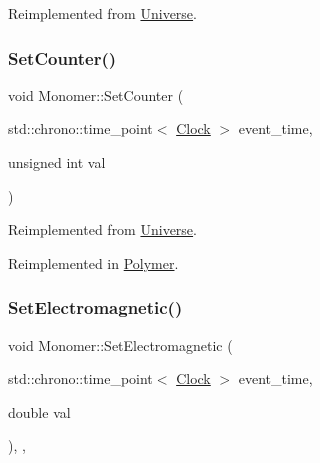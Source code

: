 Reimplemented from \mbox{\hyperlink{classUniverse_a3b3da7c86a7b75e5e5c0b7972ac82a87}{Universe}}.

\mbox{\label{classMonomer_a6f0dfa4382b3d4fa19b7ee0fb8fe7a55}} 
\subsubsection{\texorpdfstring{Set\+Counter()}{SetCounter()}}
{\footnotesize\ttfamily void Monomer\+::\+Set\+Counter (\begin{DoxyParamCaption}\item[{std\+::chrono\+::time\+\_\+point$<$ \mbox{\hyperlink{universe_8h_a0ef8d951d1ca5ab3cfaf7ab4c7a6fd80}{Clock}} $>$}]{event\+\_\+time,  }\item[{unsigned int}]{val }\end{DoxyParamCaption})\hspace{0.3cm}{\ttfamily [virtual]}}



Reimplemented from \mbox{\hyperlink{classUniverse_aa22202ae740eb1355529afcb13285e91}{Universe}}.



Reimplemented in \mbox{\hyperlink{classPolymer_a1500ffc682396af2f4306c7c7ea7fd87}{Polymer}}.

\mbox{\label{classMonomer_a50e41be601b31450a97bfd15950cfb3d}} 
\subsubsection{\texorpdfstring{Set\+Electromagnetic()}{SetElectromagnetic()}}
{\footnotesize\ttfamily void Monomer\+::\+Set\+Electromagnetic (\begin{DoxyParamCaption}\item[{std\+::chrono\+::time\+\_\+point$<$ \mbox{\hyperlink{universe_8h_a0ef8d951d1ca5ab3cfaf7ab4c7a6fd80}{Clock}} $>$}]{event\+\_\+time,  }\item[{double}]{val }\end{DoxyParamCaption})\hspace{0.3cm}{\ttfamily [inline]}, {\ttfamily [final]}, {\ttfamily [virtual]}}



